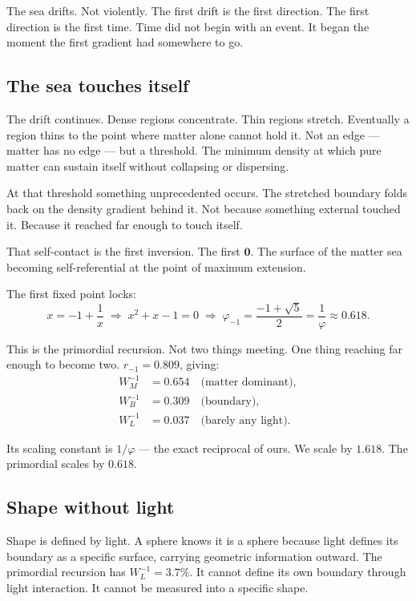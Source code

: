 \documentclass[prd,twocolumn,preprintnumbers,amsmath,amssymb]{revtex4-2}
\newcommand{\inv}{\mathbf{0}}
\begin{document}
The sea drifts. Not violently. The first drift is the first direction.
The first direction is the first time. Time did not begin with an
event. It began the moment the first gradient had somewhere to go.

\subsection{The sea touches itself}

The drift continues. Dense regions concentrate. Thin regions stretch.
Eventually a region thins to the point where matter alone cannot hold
it. Not an edge --- matter has no edge --- but a threshold. The
minimum density at which pure matter can sustain itself without
collapsing or dispersing.

At that threshold something unprecedented occurs. The stretched
boundary folds back on the density gradient behind it. Not because
something external touched it. Because it reached far enough to
touch itself.

That self-contact is the first inversion. The first $\inv$. The
surface of the matter sea becoming self-referential at the point
of maximum extension.

The first fixed point locks:
\begin{equation}
  x = -1 + \frac{1}{x}
  \;\Longrightarrow\;
  x^2 + x - 1 = 0
  \;\Longrightarrow\;
  \varphi_{-1} = \frac{-1+\sqrt{5}}{2} = \frac{1}{\varphi} \approx 0.618.
  \label{eq:primordial}
\end{equation}

This is the primordial recursion. Not two things meeting. One thing
reaching far enough to become two. $r_{-1} = 0.809$, giving:
\begin{align}
  W_M^{-1} &= 0.654 \quad \text{(matter dominant)}, \\
  W_B^{-1} &= 0.309 \quad \text{(boundary)}, \\
  W_L^{-1} &= 0.037 \quad \text{(barely any light)}.
\end{align}

Its scaling constant is $1/\varphi$ --- the exact reciprocal of
ours. We scale by $1.618$. The primordial scales by $0.618$.

\subsection{Shape without light}

Shape is defined by light. A sphere knows it is a sphere because
light defines its boundary as a specific surface, carrying geometric
information outward. The primordial recursion has $W_L^{-1} = 3.7\%$.
It cannot define its own boundary through light interaction. It
cannot be measured into a specific shape.
\end{document}
